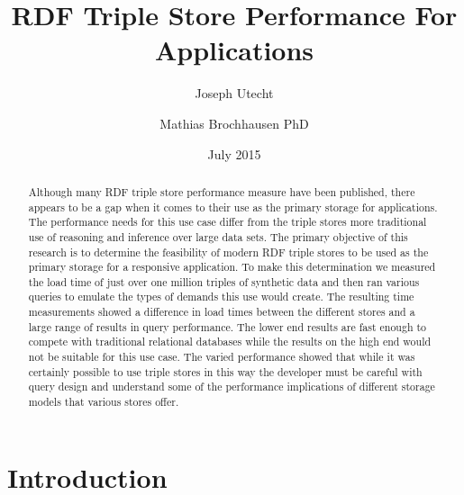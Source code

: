 \documentclass{llncs}
\title{RDF Triple Store Performance For Applications}
\author{Joseph Utecht \and Mathias Brochhausen PhD}
\institute{Department of Biomedical Informatics, University of Arkansas for Medical Sciences, Little Rock, AR}
\date{July 2015}
\begin{document}
\maketitle

\begin{abstract}
Although many RDF triple store performance measure have been published, there appears to be a gap when it comes to their use as the primary storage for applications.  The performance needs for this use case differ from the triple stores more traditional use of reasoning and inference over large data sets. The primary objective of this research is to determine the feasibility of modern RDF triple stores to be used as the primary storage for a responsive application. To make this determination we measured the load time of just over one million triples of synthetic data and then ran various queries to emulate the types of demands this use would create. The resulting time measurements showed a difference in load times between the different stores and a large range of results in query performance.  The lower end results are fast enough to compete with traditional relational databases while the results on the high end would not be suitable for this use case. The varied performance showed that while it was certainly possible to use triple stores in this way the developer must be careful with query design and understand some of the performance implications of different storage models that various stores offer.
\end{abstract}
\section{Introduction}
\end{document}
